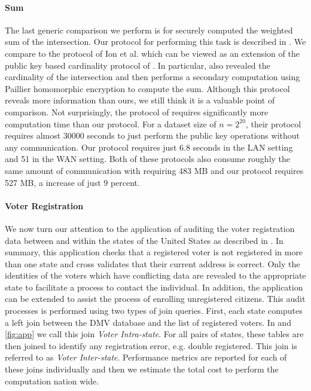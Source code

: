 \paragraph{Sum} The last generic comparison we perform is for securely computed the weighted sum of the intersection. Our protocol for performing this task is described in . We compare to the protocol of Ion et al. \cite{cryptoeprint:2017:738} which can be viewed as an extension of the public key based cardinality protocol of \cite{DBLP:conf/cans/CristofaroGT12}. In particular, \cite{cryptoeprint:2017:738}  also revealed the cardinality of the intersection and then performs a secondary computation using Paillier homomorphic encryption to compute the sum. Although this protocol reveals more information than ours, we still think it is a valuable point of comparison. Not surprisingly,  the protocol of \cite{cryptoeprint:2017:738} requires significantly more computation time than our protocol. For a dataset size of $n=2^{20}$, their protocol requires almost 30000 seconds to just perform the public key operations without any communication. Our protocol requires just 6.8 seconds in the LAN setting and 51 in the WAN setting. Both of these protocols also consume roughly the same amount of communication with \cite{cryptoeprint:2017:738} requiring 483 MB and our protocol requires 527 MB, a increase of just 9 percent. 


\paragraph{Voter Registration} We now turn our attention to the application of auditing the voter registration data between and within the states of the United States as described in . In summary, this application checks that a registered voter is not registered in more than one state and cross validates that their current address is correct. Only the identities of the voters which have conflicting data are revealed to the appropriate state to facilitate a process to contact the individual. In addition, the application can be extended to assist the process of enrolling unregistered citizens. This audit processes is performed using two types of join queries. First, each state computes a left join between the DMV database and the list of registered voters. In  and \ref{fig:app} we call this join \emph{Voter Intra-state}. For all pairs of states, these tables are then joined to identify any registration error, e.g. double registered. This join is referred to as \emph{Voter Inter-state}. Performance metrics are reported for each of these joins individually and then we estimate the total cost to perform the computation nation wide. 

